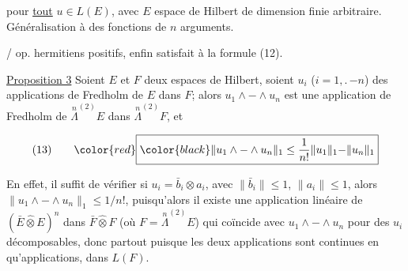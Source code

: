 pour \uline{tout} $u\in L(E)$, avec $E$ espace de Hilbert de dimension finie arbitraire. Généralisation à des fonctions de $n$ arguments.



/ op. hermitiens positifs, enfin satisfait à la formule (12).


\uline{Proposition 3} Soient $E$ et $F$ deux espaces de Hilbert, soient $u_i$ ($i=1,\mathord{.}\,\mathord{-}n$) des applications de Fredholm de $E$ dans $F$; alors $u_1\wedge\mathord{-}\wedge u_n$ est une application de Fredholm de $\overset{n}{\Lambda}^{(2)}E$ dans $\overset{n}{\Lambda}^{(2)}F$, et
\reversemarginpar{}\normalmarginpar

\[
\begin{array}{@{}l@{\qquad}l@{}}
(13) & {\color{red}\boxed{\color{black}\displaystyle \lVert u_1\wedge\mathord{-}\wedge u_n\rVert_1\leq\frac1{n!}\lVert u_1\rVert_1\mathord{-}\lVert u_n\rVert_1}}
\end{array}
\]

En effet, il suffit de \deleted{\unsure{$\leq$}} vérifier  si  $u_i=\bar b_i\otimes a_i$,  avec $\lVert\bar b_i\rVert\leq1$, $\lVert a_i\rVert\leq1$, alors $\lVert u_1\wedge\mathord{-}\wedge u_n\rVert_1\leq1/n!$,  puisqu'alors il existe une application  linéaire   de $(\bar E\widehat{\otimes}E)^n$ dans  $\bar F\widehat{\otimes}F$ (où $F=\overset{n}{\Lambda}^{(2)}E$) qui coïncide avec  $u_1\wedge\mathord{-}\wedge u_n$ pour des $u_i$ décomposables, donc partout puisque les deux applications sont continues  en  qu'applications, dans $L(F)$.


